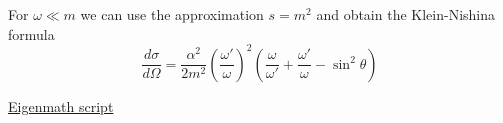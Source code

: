 For $\omega\ll m$ we can use the approximation $s=m^2$ and obtain the Klein-Nishina formula
\begin{equation*}
\frac{d\sigma}{d\Omega}
=\frac{\alpha^2}{2m^2}
\left(\frac{\omega'}{\omega}\right)^2
\left(
\frac{\omega}{\omega'}+\frac{\omega'}{\omega}-\sin^2\theta
\right)
\end{equation*}

\href{https://georgeweigt.github.io/examples/compton-scattering-2-demo.html}{Eigenmath script}


